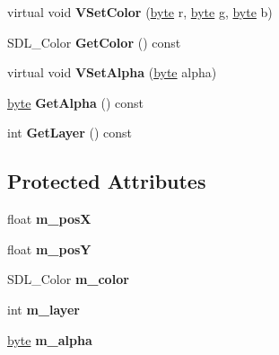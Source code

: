 \begin{DoxyCompactItemize}
\item 
\hypertarget{classGfxElement_abc161d2867f6359dc5102b24de73db47}{virtual void {\bfseries V\-Set\-Color} (\hyperlink{GameStd_8h_a0c8186d9b9b7880309c27230bbb5e69d}{byte} r, \hyperlink{GameStd_8h_a0c8186d9b9b7880309c27230bbb5e69d}{byte} g, \hyperlink{GameStd_8h_a0c8186d9b9b7880309c27230bbb5e69d}{byte} b)}\label{classGfxElement_abc161d2867f6359dc5102b24de73db47}

\item 
\hypertarget{classGfxElement_a13362b057909c8f1c3fe986252e8e59d}{S\-D\-L\-\_\-\-Color {\bfseries Get\-Color} () const }\label{classGfxElement_a13362b057909c8f1c3fe986252e8e59d}

\item 
\hypertarget{classGfxElement_a0700a28e408f8f5a6212c233f9b6f213}{virtual void {\bfseries V\-Set\-Alpha} (\hyperlink{GameStd_8h_a0c8186d9b9b7880309c27230bbb5e69d}{byte} alpha)}\label{classGfxElement_a0700a28e408f8f5a6212c233f9b6f213}

\item 
\hypertarget{classGfxElement_a6e8a0048bd82b1bf41127fc75ff36699}{\hyperlink{GameStd_8h_a0c8186d9b9b7880309c27230bbb5e69d}{byte} {\bfseries Get\-Alpha} () const }\label{classGfxElement_a6e8a0048bd82b1bf41127fc75ff36699}

\item 
\hypertarget{classGfxElement_a73f352adee885d4a799cdf960588a769}{int {\bfseries Get\-Layer} () const }\label{classGfxElement_a73f352adee885d4a799cdf960588a769}

\end{DoxyCompactItemize}
\subsection*{Protected Attributes}
\begin{DoxyCompactItemize}
\item 
\hypertarget{classGfxElement_a3d9cac49620edb122236ab57ce7544bf}{float {\bfseries m\-\_\-pos\-X}}\label{classGfxElement_a3d9cac49620edb122236ab57ce7544bf}

\item 
\hypertarget{classGfxElement_a430e4d090a7ec58e1d9e252460d47a6c}{float {\bfseries m\-\_\-pos\-Y}}\label{classGfxElement_a430e4d090a7ec58e1d9e252460d47a6c}

\item 
\hypertarget{classGfxElement_a827c874f44ef28105d474a99970b5d8b}{S\-D\-L\-\_\-\-Color {\bfseries m\-\_\-color}}\label{classGfxElement_a827c874f44ef28105d474a99970b5d8b}

\item 
\hypertarget{classGfxElement_ada0d2e2e41edd4bdd900b2676f79ca1f}{int {\bfseries m\-\_\-layer}}\label{classGfxElement_ada0d2e2e41edd4bdd900b2676f79ca1f}

\item 
\hypertarget{classGfxElement_a2cb0d3c84b78f591af6f57fa7f0003c7}{\hyperlink{GameStd_8h_a0c8186d9b9b7880309c27230bbb5e69d}{byte} {\bfseries m\-\_\-alpha}}\label{classGfxElement_a2cb0d3c84b78f591af6f57fa7f0003c7}

\end{DoxyCompactItemize}


